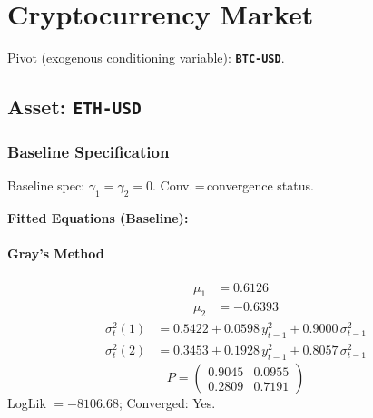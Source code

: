 \documentclass[11pt, a4paper]{article}
\begin{document}
\clearpage
\section{Cryptocurrency Market}
\noindent Pivot (exogenous conditioning variable): \textbf{\texttt{BTC-USD}}.

\subsection{Asset: \texttt{ETH-USD}}
\subsubsection*{Baseline Specification}
\begin{table}[H]
\centering\scriptsize
\caption{ETH-USD --- Baseline Specification}
\label{tab:ethusd_baseline}
\smallskip
\begin{flushleft}\scriptsize Baseline spec: $\gamma_1 = \gamma_2 = 0$. Conv.\,=\,convergence status.\end{flushleft}
\end{table}

\medskip
\noindent\textbf{Fitted Equations (Baseline):}
\paragraph{Gray's Method}
\begin{align}
\mu_{1} &= 0.6126 \\
\mu_{2} &= -0.6393
\end{align}
\begin{align}
\sigma^2_{t}(1) &= 0.5422 + 0.0598\, y_{t-1}^2 + 0.9000\, \sigma^2_{t-1} \\
\sigma^2_{t}(2) &= 0.3453 + 0.1928\, y_{t-1}^2 + 0.8057\, \sigma^2_{t-1}
\end{align}
\begin{equation}
P = \begin{pmatrix} 0.9045 & 0.0955 \\ 0.2809 & 0.7191 \end{pmatrix}
\end{equation}
LogLik $= -8106.68$; Converged: Yes.
\end{document}
